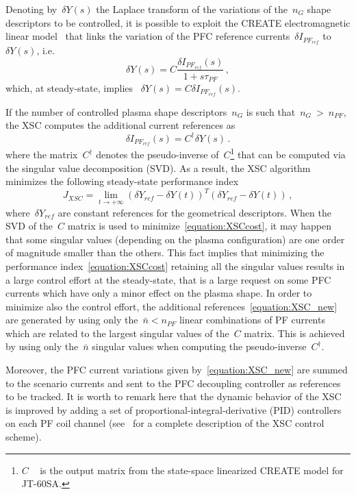Denoting by~$\delta Y(s)$ the Laplace transform of the variations of the~$n_G$ shape descriptors  to be controlled, it is possible to exploit the CREATE electromagnetic linear model~\cite{NCruz} that links the variation of the PFC reference currents~$\delta I_{PF_{ref}}$ to ~$\delta Y(s)$, i.e.
\[
\delta Y(s) = C\frac{\delta I_{PF_{ref}}(s)}{1+s\tau_{PF}}\,,
\]
which, at steady-state, implies~ $\delta Y(s) = C \delta I_{PF_{ref}}(s)$.

If the number of controlled plasma shape descriptors~$n_G$ is such that~$n_G~>~n_{PF}$, the XSC computes the additional current references as
\begin{equation}\label{equation:XSC_new}
\delta I_{PF_{ref}}(s)=C^\dag\delta Y(s)\,.
\end{equation}
where the matrix~$C^\dag$ denotes the pseudo-inverse of~$C$\footnote{$C$ ~ is the output matrix from the state-space linearized CREATE model for JT-60SA.} that can be computed via the singular value decomposition (SVD). As a result, the XSC algorithm minimizes the following steady-state performance index
\begin{equation}\label{equation:XSCcost}
J_{XSC} = \lim_{t\to +
	\infty}(\delta Y_{ref}-\delta Y(t))^T(\delta Y_{ref}-\delta Y(t))\,,
\end{equation}
where~$\delta Y_{ref}$ are constant references for the geometrical descriptors. When the SVD of the~$C$ matrix is used to minimize~\eqref{equation:XSCcost}, it may happen that some singular values (depending on the plasma configuration) are one order of magnitude smaller than the others. This fact implies that minimizing the performance index~\eqref{equation:XSCcost} retaining all the singular values results in a large control effort at the steady-state, that is a large request on some PFC currents which have only a minor effect on the plasma shape. In order to minimize also the control effort, the additional references~\eqref{equation:XSC_new} are generated by using only the~$\bar{n}<n_{PF}$ linear combinations of PF currents which are related to the largest singular values of the~$C$ matrix. This is achieved by using only the~$\bar{n}$ singular values when computing the pseudo-inverse~$C^\dag$.
\smallskip

Moreover, the PFC current variations given by~\eqref{equation:XSC_new} are summed to the scenario currents and sent to the PFC decoupling controller as references to be tracked. It is worth to remark here that the dynamic behavior of the XSC is improved by adding a set of proportional-integral-derivative (PID) controllers on each PF coil channel (see~\cite{Ariola:XSC} for a complete description of the XSC control scheme).
\smallskip

